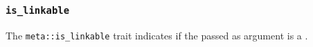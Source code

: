 
\subsubsection{\texttt{is\_linkable}}

The \texttt{meta::is\_linkable}
trait indicates if the  passed as argument is a .


